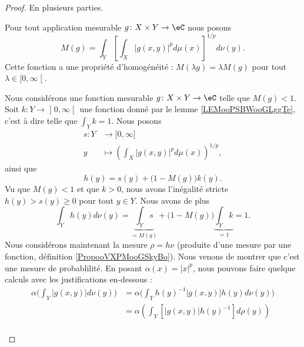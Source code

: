 \begin{proof}
    En plusieurs parties.
    \begin{subproof}
    \item[La fonction $M$]
    Pour tout application mesurable \( g\colon X\times Y\to \eC\) nous posons
    \begin{equation}
        M(g)=\int_Y \left[ \int_X| g(x,y) |^pd\mu(x) \right]^{1/p}d\nu(y).
    \end{equation}
    Cette fonction a une propriété d'homogénéité : \( M(\lambda g)=\lambda M(g)\) pour tout \( \lambda\in \mathopen[ 0 , \infty \mathclose[\).
    \item[Si $ M(g)<1 $]
    Nous considérons une fonction mesurable \( g\colon X\times Y\to \eC\) telle que \( M(g)<1\). Soit \( k\colon Y\to \mathopen] 0 , \infty \mathclose[\) une fonction donné par le lemme \ref{LEMooPSBWooGLggTe}, c'est à dire telle que \( \int_Yk=1\). Nous posons
        \begin{equation}
            \begin{aligned}
                s\colon Y&\to \mathopen[ 0 , \infty \mathclose] \\
                y&\mapsto \left( \int_X| g(x,y) |^pd\mu(x) \right)^{1/p}, 
            \end{aligned}
        \end{equation}
        ainsi que
        \begin{equation}
            h(y)=s(y)+\big(1-M(g)\big)k(y).
        \end{equation}
        Vu que \( M(g)<1\) et que \( k>0\), nous avons l'inégalité stricte \( h(y)>s(y)\geq 0\) pour tout \( y\in Y\). Nous avons de plus
        \begin{equation}
            \int_Y h(y)d\nu(y)=\underbrace{\int_Ys}_{=M(g)}+\big( 1-M(g) \big)\underbrace{\int_Yk}_{=1}=1.
        \end{equation}
        Nous considérons maintenant la mesure \( \rho=h\nu\) (produite d'une mesure par une fonction, définition \ref{PropooVXPMooGSkyBo}). Nous venons de montrer que c'est une mesure de probablilité. En posant \( \alpha(x)=| x |^p\), nous pouvons faire quelque calculs avec les justifications en-dessous :
        \begin{subequations}        \label{SUBEQSooPPZIooSEDcpS}
            \begin{align}
                \alpha\big( \int_Y|g(x,y)|d\nu(y)\big)&=\alpha\big( \int_Yh(y)^{-1}|g(x,y)|h(y)d\nu(y)\big)\\
                &=\alpha\left( \int_Y [|g(x,y)|h(y)^{-1}]d\rho(y) \right)\\

\end{align}
\end{subequations}
\end{subproof}
\end{proof}
